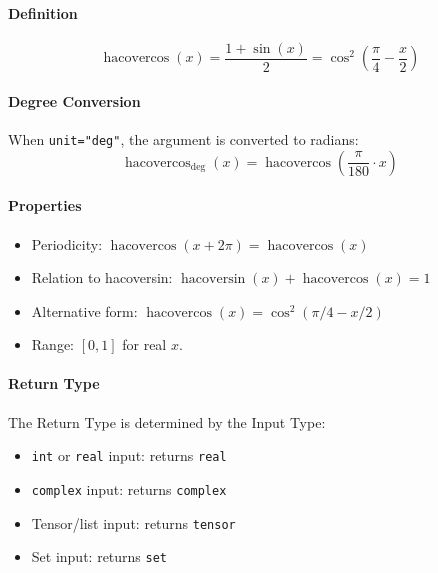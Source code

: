 \paragraph{Definition}
\[
\operatorname{hacovercos}(x) = \frac{1 + \sin(x)}{2} = \cos^2\left(\frac{\pi}{4} - \frac{x}{2}\right)
\]

\paragraph{Degree Conversion}
When \texttt{unit="deg"}, the argument is converted to radians:
\[
\operatorname{hacovercos}_{\text{deg}}(x) = \operatorname{hacovercos}\left(\frac{\pi}{180} \cdot x\right)
\]

\paragraph{Properties}
\begin{itemize}
\item Periodicity: $\operatorname{hacovercos}(x + 2\pi) = \operatorname{hacovercos}(x)$
\item Relation to hacoversin: $\operatorname{hacoversin}(x) + \operatorname{hacovercos}(x) = 1$
\item Alternative form: $\operatorname{hacovercos}(x) = \cos^2(\pi/4 - x/2)$
\item Range: $[0, 1]$ for real $x$.
\end{itemize}

\paragraph{Return Type}
The Return Type is determined by the Input Type:
\begin{itemize}
\item \texttt{int} or \texttt{real} input: returns \texttt{real}
\item \texttt{complex} input: returns \texttt{complex}
\item Tensor/list input: returns \texttt{tensor}
\item Set input: returns \texttt{set}
\end{itemize}

